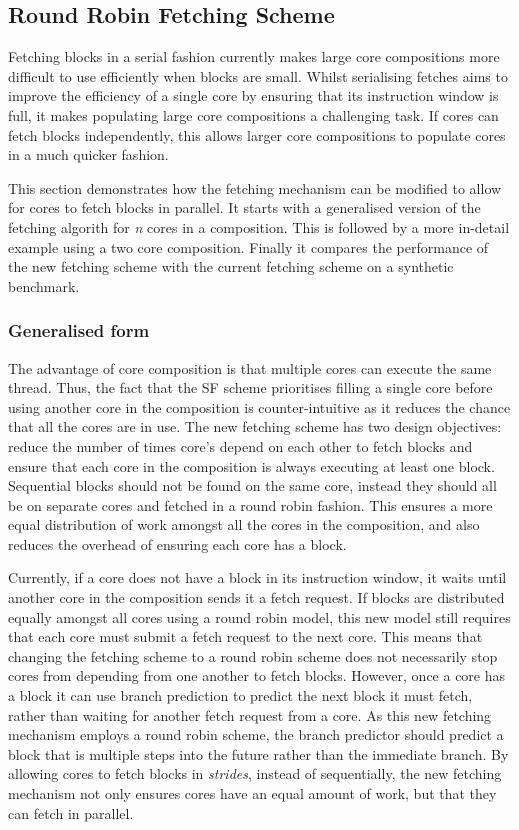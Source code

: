 \subsection{Round Robin Fetching Scheme}

Fetching blocks in a serial fashion currently makes large core compositions more difficult to use efficiently when blocks are small.
Whilst serialising fetches aims to improve the efficiency of a single core by ensuring that its instruction window is full, it makes populating large core compositions a challenging task.
If cores can fetch blocks independently, this allows larger core compositions to populate cores in a much quicker fashion.

This section demonstrates how the fetching mechanism can be modified to allow for cores to fetch blocks in parallel.
It starts with a generalised version of the fetching algorith for \textit{n} cores in a composition.
This is followed by a more in-detail example using a two core composition.
Finally it compares the performance of the new fetching scheme with the current fetching scheme on a synthetic benchmark.

\subsubsection{Generalised form}
The advantage of core composition is that multiple cores can execute the same thread.
Thus, the fact that the SF scheme prioritises filling a single core before using another core in the composition is counter-intuitive as it reduces the chance that all the cores are in use.
The new fetching scheme has two design objectives: reduce the number of times core's depend on each other to fetch blocks and ensure that each core in the composition is always executing at least one block.
Sequential blocks should not be found on the same core, instead they should all be on separate cores and fetched in a round robin fashion.
This ensures a more equal distribution of work amongst all the cores in the composition, and also reduces the overhead of ensuring each core has a block.

Currently, if a core does not have a block in its instruction window, it waits until another core in the composition sends it a fetch request.
If blocks are distributed equally amongst all cores using a round robin model, this new model still requires that each core must submit a fetch request to the next core.
This means that changing the fetching scheme to a round robin scheme does not necessarily stop cores from depending from one another to fetch blocks.
However, once a core has a block it can use branch prediction to predict the next block it must fetch, rather than waiting for another fetch request from a core.
As this new fetching mechanism employs a round robin scheme, the branch predictor should predict a block that is multiple steps into the future rather than the immediate branch.
By allowing cores to fetch blocks in \textit{strides}, instead of sequentially, the new fetching mechanism not only ensures cores have an equal amount of work, but that they can fetch in parallel.

